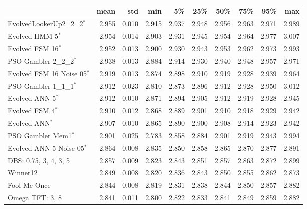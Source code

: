 \begin{tabular}{lrrrrrrrrr}
\toprule
{} &   mean &    std &    min &     5\% &    25\% &    50\% &    75\% &    95\% &    max \\
\midrule
EvolvedLookerUp2\_2\_2$^{*}$  &  2.955 &  0.010 &  2.915 &  2.937 &  2.948 &  2.956 &  2.963 &  2.971 &  2.989 \\
Evolved HMM 5$^{*}$           &  2.954 &  0.014 &  2.903 &  2.931 &  2.945 &  2.954 &  2.964 &  2.977 &  3.007 \\
Evolved FSM 16$^{*}$          &  2.952 &  0.013 &  2.900 &  2.930 &  2.943 &  2.953 &  2.962 &  2.973 &  2.993 \\
PSO Gambler 2\_2\_2$^{*}$       &  2.938 &  0.013 &  2.884 &  2.914 &  2.930 &  2.940 &  2.948 &  2.957 &  2.971 \\
Evolved FSM 16 Noise 05$^{*}$ &  2.919 &  0.013 &  2.874 &  2.898 &  2.910 &  2.919 &  2.928 &  2.939 &  2.964 \\
PSO Gambler 1\_1\_1$^{*}$       &  2.912 &  0.023 &  2.810 &  2.873 &  2.896 &  2.912 &  2.928 &  2.950 &  3.012 \\
Evolved ANN 5$^{*}$           &  2.912 &  0.010 &  2.871 &  2.894 &  2.905 &  2.912 &  2.919 &  2.928 &  2.945 \\
Evolved FSM 4$^{*}$           &  2.910 &  0.012 &  2.868 &  2.889 &  2.901 &  2.910 &  2.918 &  2.929 &  2.942 \\
Evolved ANN$^{*}$             &  2.907 &  0.010 &  2.865 &  2.890 &  2.900 &  2.908 &  2.914 &  2.923 &  2.942 \\
PSO Gambler Mem1$^{*}$        &  2.901 &  0.025 &  2.783 &  2.858 &  2.884 &  2.901 &  2.919 &  2.943 &  2.994 \\
Evolved ANN 5 Noise 05$^{*}$  &  2.864 &  0.008 &  2.835 &  2.850 &  2.858 &  2.865 &  2.870 &  2.877 &  2.891 \\
DBS: 0.75, 3, 4, 3, 5   &  2.857 &  0.009 &  2.823 &  2.843 &  2.851 &  2.857 &  2.863 &  2.872 &  2.899 \\
Winner12                &  2.849 &  0.008 &  2.820 &  2.836 &  2.843 &  2.850 &  2.855 &  2.862 &  2.873 \\
Fool Me Once            &  2.844 &  0.008 &  2.819 &  2.831 &  2.838 &  2.844 &  2.850 &  2.857 &  2.882 \\
Omega TFT: 3, 8         &  2.841 &  0.011 &  2.800 &  2.822 &  2.833 &  2.841 &  2.849 &  2.859 &  2.882 \\
\bottomrule
\end{tabular}

